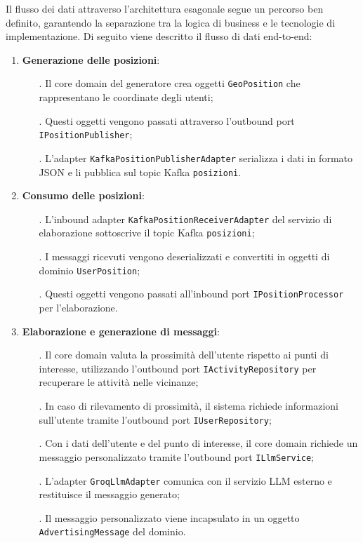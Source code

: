 \documentclass[10pt]{article}
\begin{document}
    Il flusso dei dati attraverso l'architettura esagonale segue un percorso ben definito, garantendo la separazione tra la logica di business e le tecnologie di implementazione. Di seguito viene descritto il flusso di dati end-to-end:
    
    \begin{enumerate}
        \item \textbf{Generazione delle posizioni}:
        \begin{itemize}
            \item[.] Il core domain del generatore crea oggetti \texttt{GeoPosition} che rappresentano le coordinate degli utenti;
            \item[.] Questi oggetti vengono passati attraverso l'outbound port \texttt{IPositionPublisher};
            \item[.] L'adapter \texttt{KafkaPositionPublisherAdapter} serializza i dati in formato JSON e li pubblica sul topic Kafka \texttt{posizioni}.
        \end{itemize}
        
        \item \textbf{Consumo delle posizioni}:
        \begin{itemize}
            \item[.] L'inbound adapter \texttt{KafkaPositionReceiverAdapter} del servizio di elaborazione sottoscrive il topic Kafka \texttt{posizioni};
            \item[.] I messaggi ricevuti vengono deserializzati e convertiti in oggetti di dominio \texttt{UserPosition};
            \item[.] Questi oggetti vengono passati all'inbound port \texttt{IPositionProcessor} per l'elaborazione.
        \end{itemize}
        
        \item \textbf{Elaborazione e generazione di messaggi}:
        \begin{itemize}
            \item[.] Il core domain valuta la prossimità dell'utente rispetto ai punti di interesse, utilizzando l'outbound port \texttt{IActivityRepository} per recuperare le attività nelle vicinanze;
            \item[.] In caso di rilevamento di prossimità, il sistema richiede informazioni sull'utente tramite l'outbound port \texttt{IUserRepository};
            \item[.] Con i dati dell'utente e del punto di interesse, il core domain richiede un messaggio personalizzato tramite l'outbound port \texttt{ILlmService};
            \item[.] L'adapter \texttt{GroqLlmAdapter} comunica con il servizio LLM esterno e restituisce il messaggio generato;
            \item[.] Il messaggio personalizzato viene incapsulato in un oggetto \texttt{AdvertisingMessage} del dominio.
        \end{itemize}
        

\end{enumerate}
\end{document}
